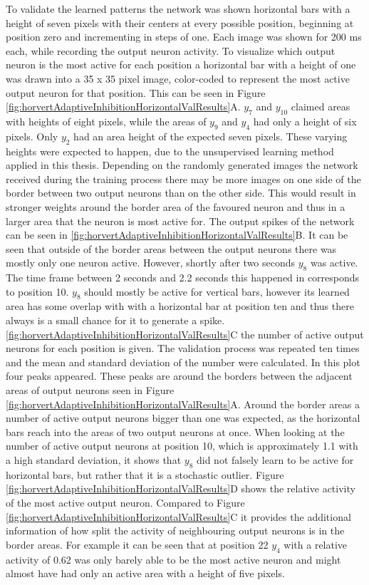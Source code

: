 To validate the learned patterns the network was shown horizontal bars with a height of seven pixels with their centers at every possible position, beginning at position zero and incrementing in steps of one. Each image was shown for 200 ms each, while recording the output neuron activity. To visualize which output neuron is the most active for each position a horizontal bar with a height of one was drawn into a 35 x 35 pixel image, color-coded to represent the most active output neuron for that position. This can be seen in Figure \ref{fig:horvertAdaptiveInhibitionHorizontalValResults}A. $y_7$ and $y_10$ claimed areas with heights of eight pixels, while the areas of $y_9$ and $y_4$ had only a height of six pixels. Only $y_2$ had an area height of the expected seven pixels. These varying heights were expected to happen, due to the unsupervised learning method applied in this thesis. Depending on the randomly generated images the network received during the training process there may be more images on one side of the border between two output neurons than on the other side. This would result in stronger weights around the border area of the favoured neuron and thus in a larger area that the neuron is most active for.
The output spikes of the network can be seen in \ref{fig:horvertAdaptiveInhibitionHorizontalValResults}B. It can be seen that outside of the border areas between the output neurons there was mostly only one neuron active. However, shortly after two seconds $y_8$ was active. The time frame between 2 seconds and 2.2 seconds this happened in corresponds to position 10. $y_8$ should mostly be active for vertical bars, however its learned area has some overlap with with a horizontal bar at position ten and thus there always is a small chance for it to generate a spike. 
\ref{fig:horvertAdaptiveInhibitionHorizontalValResults}C the number of active output neurons for each position is given.  The validation process was repeated ten times and the mean and standard deviation of the number were calculated. In this plot four peaks appeared. These peaks are around the borders between the adjacent areas of output neurons seen in Figure \ref{fig:horvertAdaptiveInhibitionHorizontalValResults}A. Around the border areas a number of active output neurons bigger than one was expected, as the horizontal bars reach into the areas of two output neurons at once. When looking at the number of active output neurons at position 10, which is approximately 1.1 with a high standard deviation, it shows that $y_8$ did not falsely learn to be active for horizontal bars, but rather that it is a stochastic outlier. Figure \ref{fig:horvertAdaptiveInhibitionHorizontalValResults}D shows the relative activity of the most active output neuron. Compared to Figure \ref{fig:horvertAdaptiveInhibitionHorizontalValResults}C it provides the  additional information of how split the activity of neighbouring output neurons is in the border areas. For example it can be seen that at position 22 $y_4$ with a relative activity of 0.62 was only barely able to be the most active neuron and might almost have had only an active area with a height of five pixels.

